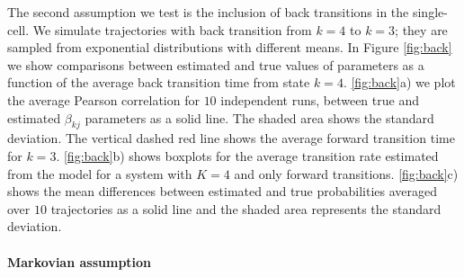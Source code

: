 The second assumption we test is the inclusion of back transitions in the single-cell. We simulate trajectories with back transition from $k=4$ to $k=3$; they are sampled from exponential distributions with different means. In Figure \ref{fig:back} we show comparisons between estimated and true values of parameters as a function of the average back transition time from state $k=4$. \ref{fig:back}a) we plot the average Pearson correlation for $10$ independent runs, between true and estimated $\beta_{kj}$ parameters as a solid line. The shaded area shows the standard deviation. The vertical dashed red line shows the average forward transition time for $k=3$. \ref{fig:back}b) shows boxplots for the average transition rate estimated from the model for a system with $K=4$ and only forward transitions. \ref{fig:back}c) shows the mean differences between estimated and true probabilities averaged over $10$ trajectories as a solid line and the shaded area represents the standard deviation.

\paragraph{Markovian assumption}
\label{sec:stud-t-distr}


